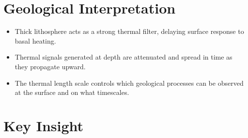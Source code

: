 \documentclass[11pt,a4paper]{article}
\begin{document}
\section*{Geological Interpretation}

\begin{itemize}
  \item Thick lithosphere acts as a strong thermal filter, delaying surface
  response to basal heating.
  \item Thermal signals generated at depth are attenuated and spread in time as
  they propagate upward.
  \item The thermal length scale controls which geological processes can be
  observed at the surface and on what timescales.
\end{itemize}

\section*{Key Insight}

\vspace{0.5em}

\noindent
{}
\end{document}
